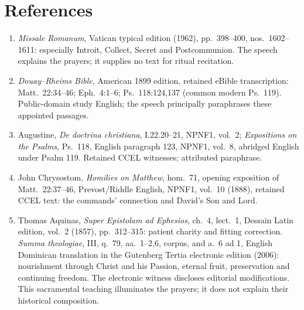 \section*{References}
\begin{enumerate}
\setlength{\itemsep}{0.25em}
\setlength{\parsep}{0pt}
\item \emph{Missale Romanum}, Vatican typical edition (1962), pp.~398--400, nos.~1602--1611: especially Introit, Collect, Secret and Postcommunion. The speech explains the prayers; it supplies no text for ritual recitation.
\item \emph{Douay--Rheims Bible}, American 1899 edition, retained eBible transcription: Matt.~22:34--46; Eph.~4:1--6; Ps.~118:124,137 (common modern Ps.~119). Public-domain study English; the speech principally paraphrases these appointed passages.
\item Augustine, \emph{De doctrina christiana}, I.22.20--21, NPNF1, vol.~2; \emph{Expositions on the Psalms}, Ps.~118, English paragraph 123, NPNF1, vol.~8, abridged English under Psalm 119. Retained CCEL witnesses; attributed paraphrase.
\item John Chrysostom, \emph{Homilies on Matthew}, hom.~71, opening exposition of Matt.~22:37--46, Prevost/Riddle English, NPNF1, vol.~10 (1888), retained CCEL text: the commands' connection and David's Son and Lord.
\item Thomas Aquinas, \emph{Super Epistolam ad Ephesios}, ch.~4, lect.~1, Dessain Latin edition, vol.~2 (1857), pp.~312--315: patient charity and fitting correction. \emph{Summa theologiae}, III, q.~79, aa.~1--2,6, corpus, and a.~6 ad 1, English Dominican translation in the Gutenberg Tertia electronic edition (2006): nourishment through Christ and his Passion, eternal fruit, preservation and continuing freedom. The electronic witness discloses editorial modifications. This sacramental teaching illuminates the prayers; it does not explain their historical composition.
\end{enumerate}
\endgroup
